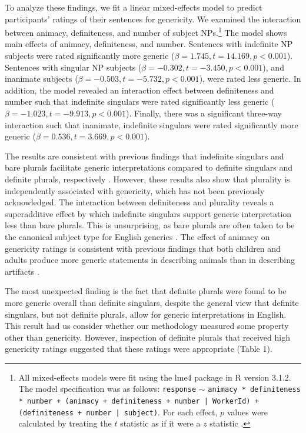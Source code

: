 \documentclass[10pt,letterpaper]{article}
\begin{document}
To analyze these findings, we fit a linear mixed-effects model to predict participants' ratings of their sentences for genericity. We examined the interaction between animacy, definiteness, and number of subject NPs.\footnote{All mixed-effects models were fit using the lme4 package in R version 3.1.2. The model specification was as follows: \texttt{response} \(\sim\) \texttt{animacy * definiteness * number + (animacy + definiteness + number | WorkerId) + (definiteness + number | subject)}. For each effect, \(p\) values were calculated by treating the \(t\) statistic as if it were a \(z\) statistic \cite{Barr:2013}.} The model shows main effects of animacy, definiteness, and number. Sentences with indefinite NP subjects were rated significantly more generic (\(\beta = 1.745, t = 14.169, p < 0.001\)). Sentences with singular NP subjects (\(\beta = -0.302, t = -3.450, p < 0.001\)), and inanimate subjects (\(\beta = -0.503, t = -5.732, p < 0.001\)), were rated less generic. In addition, the model revealed an interaction effect between definiteness and number such that indefinite singulars were rated significantly less generic (\(\beta = -1.023, t = -9.913, p < 0.001\)). Finally, there was a significant three-way interaction such that inanimate, indefinite singulars were rated significantly more generic (\(\beta = 0.536, t = 3.669, p < 0.001\)). 

The results are consistent with previous findings that indefinite singulars and bare plurals facilitate generic interpretations compared to definite singulars and definite plurals, respectively \cite{Cimpian:2011, Gelman:2003}. However, these results also show that plurality is independently associated with genericity, which has not been previously acknowledged. The interaction between definiteness and plurality reveals a superadditive effect by which indefinite singulars support generic interpretation less than bare plurals. This is unsurprising, as bare plurals are often taken to be the canonical subject type for English generics \cite{Carlson:1977,Krifka:1995,Lyons:1977}. The effect of animacy on genericity ratings is consistent with previous findings that both children and adults produce more generic statements in describing animals than in describing artifacts \cite{Brandone:2009}.

The most unexpected finding is the fact that definite plurals were found to be more generic overall than definite singulars, despite the general view that definite singulars, but not definite plurals, allow for generic interpretations in English. This result had us consider whether our methodology measured some property other than genericity. However, inspection of definite plurals that received high genericity ratings suggested that these ratings were appropriate (Table 1).
\end{document}
